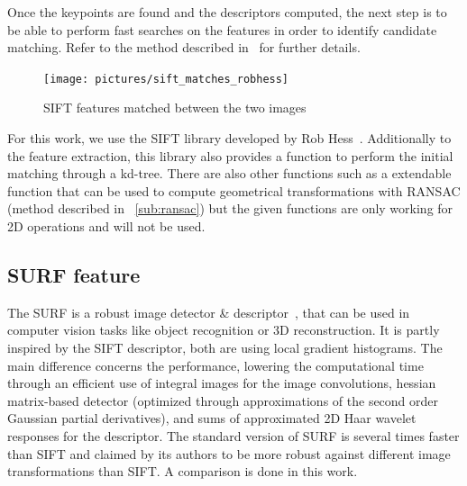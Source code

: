 Once the keypoints are found and the descriptors computed, the next step is to be able to perform fast searches on the features in order to identify candidate matching. Refer to the method described in~\cite{lowe_2004_sift} for further details.

\begin{figure}[H]
\centering
\texttt{[image: pictures/sift\_matches\_robhess]}
\caption{SIFT features matched between the two images}
\end{figure}

For this work, we use the \gls{SIFT} library developed by Rob Hess~\cite{hess_sift}. Additionally to the feature extraction, this library also provides a function to perform the initial matching through a kd-tree. There are also other functions such as a extendable function that can be used to compute geometrical transformations with \gls{RANSAC} (method described in ~\ref{sub:ransac}) but the given functions are only working for 2D operations and will not be used.

\subsection{SURF feature}

The \gls{SURF} is a robust image detector \& descriptor~\cite{surf}, that can be used in computer vision tasks like object recognition or 3D reconstruction. It is partly inspired by the \gls{SIFT} descriptor, both are using local gradient histograms. The main difference concerns the performance, lowering the computational time through an efficient use of integral images for the image convolutions, hessian matrix-based detector (optimized through approximations of the second order Gaussian partial derivatives), and sums of approximated 2D Haar wavelet responses for the descriptor. The standard version of \gls{SURF} is several times faster than \gls{SIFT} and claimed by its authors to be more robust against different image transformations than \gls{SIFT}. A comparison is done in this work.

